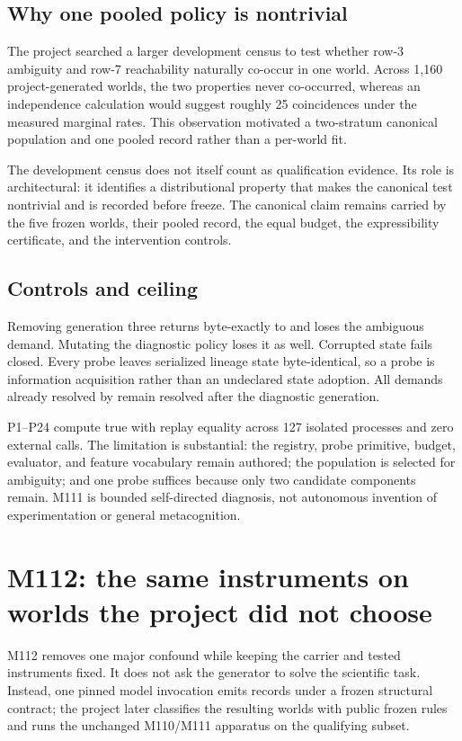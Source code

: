 \subsection{Why one pooled policy is nontrivial}
The project searched a larger development census to test whether row-3 ambiguity and row-7 reachability naturally co-occur in one world. Across 1,160 project-generated worlds, the two properties never co-occurred, whereas an independence calculation would suggest roughly 25 coincidences under the measured marginal rates. This observation motivated a two-stratum canonical population and one pooled record rather than a per-world fit.

The development census does not itself count as qualification evidence. Its role is architectural: it identifies a distributional property that makes the canonical test nontrivial and is recorded before freeze. The canonical claim remains carried by the five frozen worlds, their pooled record, the equal budget, the expressibility certificate, and the intervention controls.

\subsection{Controls and ceiling}
Removing generation three returns byte-exactly to \mtwo and loses the ambiguous demand. Mutating the diagnostic policy loses it as well. Corrupted state fails closed. Every probe leaves serialized lineage state byte-identical, so a probe is information acquisition rather than an undeclared state adoption. All demands already resolved by \mtwo remain resolved after the diagnostic generation.

P1--P24 compute true with replay equality across 127 isolated processes and zero external calls. The limitation is substantial: the registry, probe primitive, budget, evaluator, and feature vocabulary remain authored; the population is selected for ambiguity; and one probe suffices because only two candidate components remain. M111 is bounded self-directed diagnosis, not autonomous invention of experimentation or general metacognition.

\section{M112: the same instruments on worlds the project did not choose}
\label{sec:m112}
M112 removes one major confound while keeping the carrier and tested instruments fixed. It does not ask the generator to solve the scientific task. Instead, one pinned model invocation emits records under a frozen structural contract; the project later classifies the resulting worlds with public frozen rules and runs the unchanged M110/M111 apparatus on the qualifying subset.

